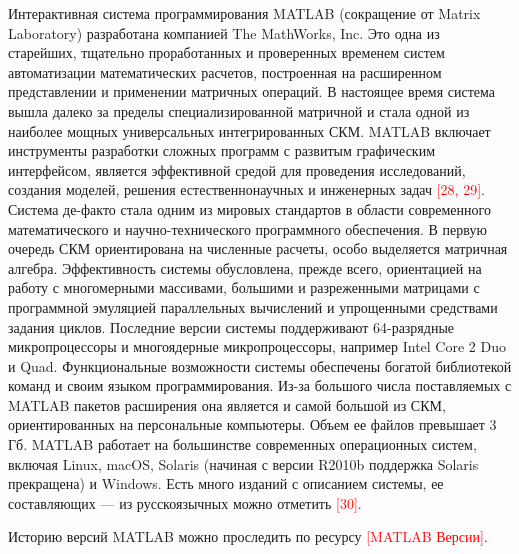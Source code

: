 Интерактивная система программирования MATLAB (сокращение от Matrix Laboratory) разработана компанией The MathWorks, Inc. Это одна из старейших, тщательно проработанных и проверенных временем систем автоматизации математических расчетов, построенная на расширенном представлении и применении матричных операций. В настоящее время система вышла далеко за пределы специализированной матричной и стала одной из наиболее мощных универсальных интегрированных СКМ. MATLAB включает инструменты разработки сложных программ с развитым графическим интерфейсом, является эффективной средой для проведения исследований, создания моделей, решения естественнонаучных и инженерных задач \textcolor{red}{[28, 29]}. Система де-факто стала одним из мировых стандартов в области современного математического и научно-технического программного обеспечения. В первую очередь СКМ ориентирована на численные расчеты, особо выделяется матричная алгебра. Эффективность системы обусловлена, прежде всего, ориентацией на работу с многомерными массивами, большими и разреженными матрицами с программной эмуляцией параллельных вычислений и упрощенными средствами задания циклов. Последние версии системы поддерживают 64-разрядные микропроцессоры и многоядерные микропроцессоры, например Intel Core 2 Duo и Quad. Функциональные возможности системы обеспечены богатой библиотекой команд и своим языком программирования. Из-за большого числа поставляемых с MATLAB пакетов расширения она является и самой большой из СКМ, ориентированных на персональные компьютеры. Объем ее файлов превышает 3 Гб. 
MATLAB работает на большинстве современных операционных систем, включая Linux, macOS, Solaris (начиная с версии R2010b поддержка Solaris прекращена) и Windows. 
Есть много изданий с описанием системы, ее составляющих --- из русскоязычных можно отметить \textcolor{red}{[30]}. 

Историю версий MATLAB можно проследить по ресурсу \textcolor{red}{[MATLAB Версии]}.

